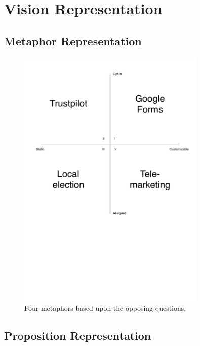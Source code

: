 \section{Vision Representation}

\subsection{Metaphor Representation}

\begin{figure}[!htbp]
	\centering
	\includegraphics[width=0.8\textwidth]{graphic/problem_analysis/vision/metaphor.pdf}
	\caption{Four metaphors based upon the opposing questions.}
	\label{fig:metaphor}
\end{figure}
\FloatBarrier

\subsection{Proposition Representation}

